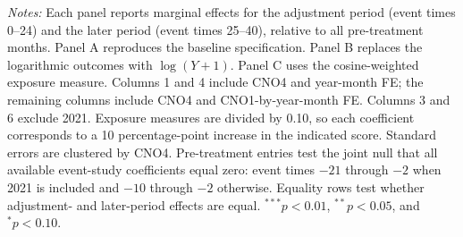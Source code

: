 \begin{table}[H]
\begin{threeparttable}
\begin{minipage}{0.92\textwidth}
\emph{Notes:} Each panel reports marginal effects for the adjustment period (event times 0--24) and the later period (event times 25--40), relative to all pre-treatment months. Panel A reproduces the baseline specification. Panel B replaces the logarithmic outcomes with $\log(Y+1)$. Panel C uses the cosine-weighted exposure measure. Columns 1 and 4 include CNO4 and year-month FE; the remaining columns include CNO4 and CNO1-by-year-month FE. Columns 3 and 6 exclude 2021. Exposure measures are divided by 0.10, so each coefficient corresponds to a 10 percentage-point increase in the indicated score. Standard errors are clustered by CNO4. Pre-treatment entries test the joint null that all available event-study coefficients equal zero: event times $-21$ through $-2$ when 2021 is included and $-10$ through $-2$ otherwise. Equality rows test whether adjustment- and later-period effects are equal. $^{***}p<0.01$, $^{**}p<0.05$, and $^{*}p<0.10$.
\end{minipage}
\end{threeparttable}
\end{table}
